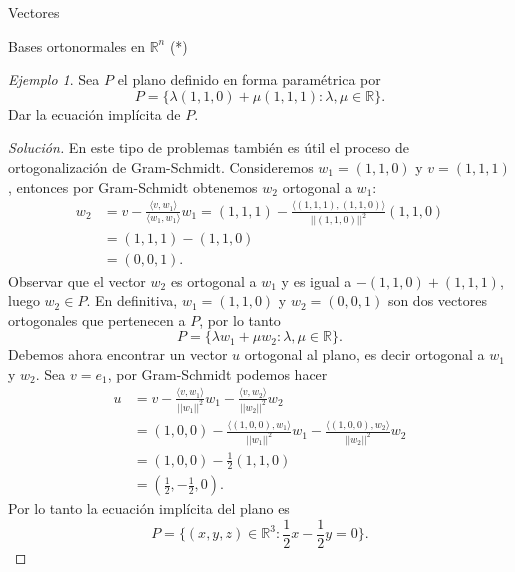 \documentclass[a4paper,12pt,twoside,spanish,reqno]{amsbook}
\numberwithin{equation}{section}
\theoremstyle{definition}
\theoremstyle{remark}
\newtheorem*{ejemplo*}{Ejemplo}
\newcommand{\la}{\langle}
\newcommand{\ra}{\rangle}
\newcommand{\R}{\mathbb R}
\begin{document}
\begin{chapter}{Vectores}
\begin{section}{Bases ortonormales en $\R^n$ (*)}
\begin{ejemplo*}
    Sea $P$ el plano definido en forma paramétrica por 
    \begin{equation*}
        P = \{\lambda(1,1,0) + \mu(1,1,1): \lambda, \mu \in \R\}.
    \end{equation*}
    Dar la ecuación implícita de $P$.
\end{ejemplo*}
\begin{proof}[Solución]
    En  este tipo de problemas también es útil el proceso de ortogonalización de Gram-Schmidt. Consideremos $w_1 = (1,1,0)$ y $v =(1,1,1)$,  entonces por Gram-Schmidt obtenemos $w_2$ ortogonal a $w_1$:
    \begin{align*}
        w_2 &= v - \frac{\la v,w_1\ra}{\la w_1,w_1\ra}w_1  = (1,1,1) - \frac{\la (1,1,1),(1,1,0)\ra}{||(1,1,0)||^2}(1,1,0) \\
        &=  (1,1,1) - (1,1,0) \\
        &=(0,0,1).
    \end{align*}
    Observar que el vector $w_2$ es ortogonal a $w_1$ y  es igual a  $ - (1,1,0) + (1,1,1)$, luego $w_2 \in P$. En definitiva, $w_1 = (1,1,0)$ y $w_2=(0,0,1)$ son dos vectores ortogonales que pertenecen a $P$, por lo tanto 
    \begin{equation*}
        P = \{\lambda w_1 + \mu w_2: \lambda, \mu \in \R\}.
    \end{equation*}
    Debemos ahora encontrar un vector $u$ ortogonal al plano,  es decir ortogonal a $w_1$ y $w_2$. Sea $v =e_1$, por Gram-Schmidt podemos hacer
    \begin{align*}
        u&= v - \frac{\la v,w_1\ra}{||w_1||^2}w_1- \frac{\la v,w_2\ra}{||w_2||^2}w_2 \\
        &= (1,0,0) - \frac{\la (1,0,0),w_1\ra}{||w_1||^2}w_1- \frac{\la (1,0,0), w_2\ra}{||w_2||^2} w_2\\
        &= (1,0,0) - \frac{1}{2}(1,1,0)  \\
        &= (\frac{1}{2},-\frac{1}{2},0).
       \end{align*}
      Por lo tanto  la ecuación implícita del plano es
      \begin{equation*}
        P = \{(x,y,z)\in \R^3: \frac{1}{2}x-\frac{1}{2}y =0\}.
      \end{equation*}
\end{proof}

 


    
    



\end{section}
\end{chapter}
\end{document}
